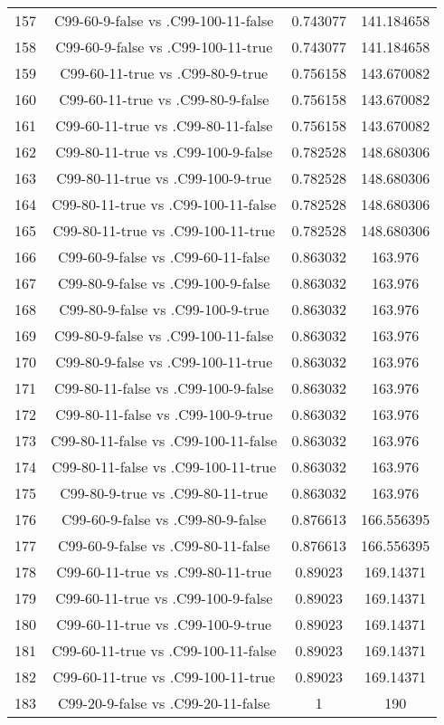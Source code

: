\documentclass[a4paper,10pt]{article}
\begin{document}
\begin{landscape}
\begin{table}[!htp]
\begin{tabular}{cccc}
157&C99-60-9-false vs .C99-100-11-false&0.743077&141.184658\\
158&C99-60-9-false vs .C99-100-11-true&0.743077&141.184658\\
159&C99-60-11-true vs .C99-80-9-true&0.756158&143.670082\\
160&C99-60-11-true vs .C99-80-9-false&0.756158&143.670082\\
161&C99-60-11-true vs .C99-80-11-false&0.756158&143.670082\\
162&C99-80-11-true vs .C99-100-9-false&0.782528&148.680306\\
163&C99-80-11-true vs .C99-100-9-true&0.782528&148.680306\\
164&C99-80-11-true vs .C99-100-11-false&0.782528&148.680306\\
165&C99-80-11-true vs .C99-100-11-true&0.782528&148.680306\\
166&C99-60-9-false vs .C99-60-11-false&0.863032&163.976\\
167&C99-80-9-false vs .C99-100-9-false&0.863032&163.976\\
168&C99-80-9-false vs .C99-100-9-true&0.863032&163.976\\
169&C99-80-9-false vs .C99-100-11-false&0.863032&163.976\\
170&C99-80-9-false vs .C99-100-11-true&0.863032&163.976\\
171&C99-80-11-false vs .C99-100-9-false&0.863032&163.976\\
172&C99-80-11-false vs .C99-100-9-true&0.863032&163.976\\
173&C99-80-11-false vs .C99-100-11-false&0.863032&163.976\\
174&C99-80-11-false vs .C99-100-11-true&0.863032&163.976\\
175&C99-80-9-true vs .C99-80-11-true&0.863032&163.976\\
176&C99-60-9-false vs .C99-80-9-false&0.876613&166.556395\\
177&C99-60-9-false vs .C99-80-11-false&0.876613&166.556395\\
178&C99-60-11-true vs .C99-80-11-true&0.89023&169.14371\\
179&C99-60-11-true vs .C99-100-9-false&0.89023&169.14371\\
180&C99-60-11-true vs .C99-100-9-true&0.89023&169.14371\\
181&C99-60-11-true vs .C99-100-11-false&0.89023&169.14371\\
182&C99-60-11-true vs .C99-100-11-true&0.89023&169.14371\\
183&C99-20-9-false vs .C99-20-11-false&1&190\\

\end{tabular}
\end{table}
\end{landscape}
\end{document}
